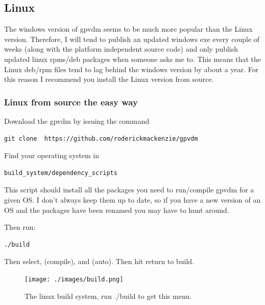 \subsection{Linux} \label{installing_on_linux}
The windows version of gpvdm seems to be much more popular than the Linux version.  Therefore, I will tend to publish an updated windows exe every couple of weeks (along with the platform independent source code) and only publish updated linux rpms/deb packages when someone asks me to.  This means that the Linux deb/rpm files tend to lag behind the windows version by about a year.  For this reason I recommend you install the Linux version from source.


\subsubsection{Linux from source the easy way}
Download the gpvdm by issuing the command

\begin{verbatim}
git clone  https://github.com/roderickmackenzie/gpvdm
\end{verbatim}
Find your operating system in

\begin{verbatim}
build_system/dependency_scripts
\end{verbatim}

This script should install all the packages you need to run/compile gpvdm for a given OS. I don't always keep them up to date, so if you have a new version of an OS and the packages have been renamed you may have to hunt around.

Then run:
\begin{verbatim}
./build
\end{verbatim}

Then select, (compile), and (auto). Then hit return to build.


\begin{figure}[H]
\centering
\texttt{[image: ./images/build.png]}
\caption{The linux build system, run ./build to get this menu.  }
\label{fig:build}
\end{figure}



